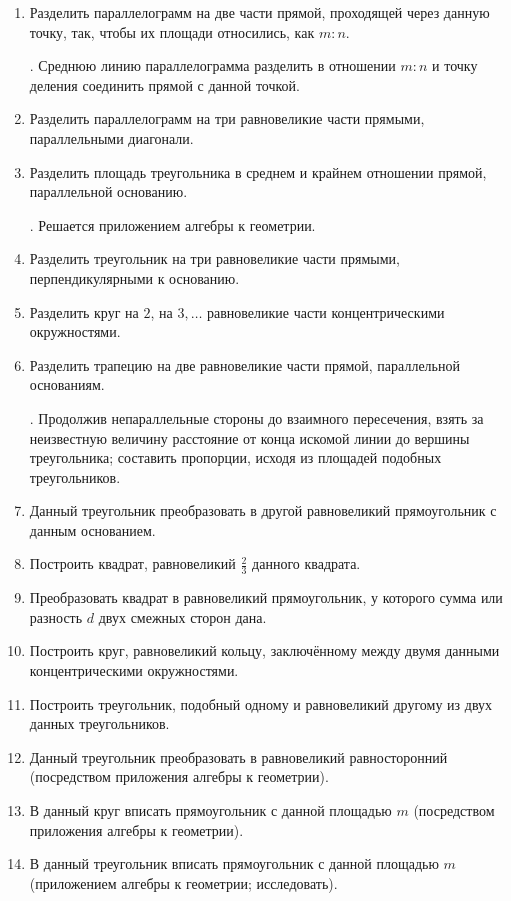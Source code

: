 \documentclass[oneside]{book}
\begin{document}
\begin{enumerate}[resume]
 \item
Разделить параллелограмм на две части прямой, проходящей через данную точку, так, чтобы их площади относились, как $m:n$.

.
Среднюю линию параллелограмма разделить в отношении $m:n$ и точку деления соединить прямой с данной точкой. %

 \item
Разделить параллелограмм на три равновеликие части прямыми, параллельными диагонали.

 \item
Разделить площадь треугольника в среднем и крайнем отношении прямой, параллельной основанию.

.
Решается приложением алгебры к геометрии.

 \item
Разделить треугольник на три равновеликие части прямыми, перпендикулярными к основанию.

 \item
Разделить круг на $2$, на $3,\dots$ равновеликие части концентрическими окружностями.

 \item
Разделить трапецию на две равновеликие части прямой, параллельной основаниям.

.
Продолжив непараллельные стороны до взаимного пересечения, взять за неизвестную величину расстояние от конца искомой линии до вершины треугольника;
составить пропорции, исходя из площадей подобных треугольников.

 \item
Данный треугольник преобразовать в другой равновеликий прямоугольник с данным основанием.

 \item
Построить квадрат, равновеликий $\tfrac23$ данного квадрата.

 \item
Преобразовать квадрат в равновеликий прямоугольник, у которого сумма или разность $d$ двух смежных сторон дана.

 \item
Построить круг, равновеликий кольцу, заключённому между двумя данными концентрическими окружностями.

 \item
Построить треугольник, подобный одному и равновеликий другому из двух данных треугольников.

 \item
Данный треугольник преобразовать в равновеликий равносторонний (посредством приложения алгебры к геометрии).

 \item
В данный круг вписать прямоугольник с данной площадью $m$ (посредством приложения алгебры к геометрии).

 \item
В данный треугольник вписать прямоугольник с данной площадью $m$ (приложением алгебры к геометрии; исследовать).

\end{enumerate}
\end{document}

